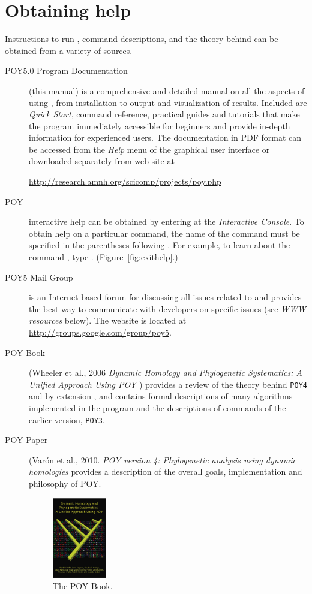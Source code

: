 {\section{Obtaining help} \label{sec:help}
Instructions to run \poy, command descriptions, and the theory behind \poy can be obtained from a variety of sources.
\begin{description}
\item[POY5.0 Program Documentation] (this manual) is a comprehensive and detailed manual on all the aspects of 
using \poy, from installation to output and visualization of results. Included are \emph{Quick Start}, \poy command 
reference, practical guides and tutorials that make the program immediately accessible for beginners and provide 
in-depth information for experienced users. The documentation in PDF format can be accessed from the \emph{Help} 
menu of the graphical user interface or downloaded separately from \poy web site at
\begin{center}
\url{http://research.amnh.org/scicomp/projects/poy.php}
\end{center}
\item[POY] interactive help can be obtained by entering  at the \poy \emph{Interactive Console}. 
To obtain help on a particular command, the name of the command must be specified in the parentheses following 
. For example, to learn about the command , type . 
(Figure~\ref{fig:exithelp}.)
\item[POY5 Mail Group] is an Internet-based forum for discussing all issues related to \poy and provides the best way to 
communicate with \poy developers on specific issues (see \emph{WWW resources} below). The website is 
located at \url{http://groups.google.com/group/poy5}. 
\item[POY Book] (Wheeler et al., 2006 \emph{Dynamic Homology and Phylogenetic Systematics: A Unified 
Approach Using POY} \cite{wheeleretal2006}) provides a review of the theory behind \texttt{POY4} and by extension \poy, and contains 
formal descriptions of many algorithms implemented in the program and the descriptions of commands of the earlier version, \texttt{POY3}.
\item[POY Paper] (Var\'on et al., 2010. \emph{POY version 4: Phylogenetic analysis using dynamic homologies} \cite{Varonetal2010} 
provides a description of the overall goals, implementation and philosophy of POY.

\begin{figure}[htbp]
   \centering
   \includegraphics[width=0.23\textwidth]{doc/figures/figpoybook.jpg}
   \caption{The POY Book.}
   \label{fig:figprocess}
\end{figure}
\end{description}

}
